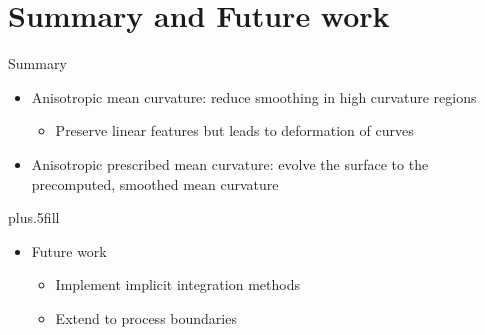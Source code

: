\documentclass{beamer}
\begin{document}
\section{Summary and Future work}

\begin{frame}{Summary}
  \begin{itemize}
  \item
    Anisotropic mean curvature: reduce smoothing in high curvature regions
    \begin{itemize}
    \item Preserve linear features but leads to deformation of curves
    \end{itemize}
  \item
    Anisotropic prescribed mean curvature: evolve the surface to the precomputed, smoothed mean curvature
  \end{itemize}
  \vskip0pt plus.5fill
  \begin{itemize}
  \item
    Future work
    \begin{itemize}
    \item Implement implicit integration methods
    \item Extend to process boundaries
    \end{itemize}
  \end{itemize}
\end{frame}


    
    

 
    

\end{document}
